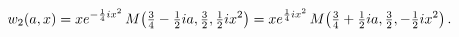 \[w_{2}(a,x)=xe^{-\frac{1}{4}ix^{2}}\mathop{M\/}\nolimits\!\left(\tfrac{3}{4}-%
\tfrac{1}{2}ia,\tfrac{3}{2},\tfrac{1}{2}ix^{2}\right)=xe^{\frac{1}{4}ix^{2}}%
\mathop{M\/}\nolimits\!\left(\tfrac{3}{4}+\tfrac{1}{2}ia,\tfrac{3}{2},-\tfrac{%
1}{2}ix^{2}\right).\]